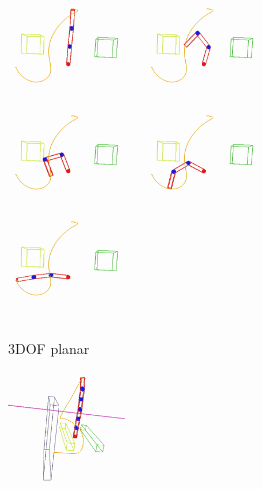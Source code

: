 \documentclass[letterpaper, 10 pt, conference]{ieeeconf}  %
\begin{document}
\begin{figure}[t!]
	\centering
	\begin{subfigure}[b]{\textwidth}
	    \centering
		\includegraphics[height=2.7cm]{fig/planning_efficiency/3dof_1}
		\includegraphics[height=2.7cm]{fig/planning_efficiency/3dof_2}
		\includegraphics[height=2.7cm]{fig/planning_efficiency/3dof_3}
		\includegraphics[height=2.7cm]{fig/planning_efficiency/3dof_4}
		\includegraphics[height=2.7cm]{fig/planning_efficiency/3dof_5}
		\caption{3DOF planar}
		\label{fig:planning_efficiency:3dof:example}
	\end{subfigure}
	\begin{subfigure}[b]{\textwidth}
	    \centering
		\includegraphics[height=3cm]{fig/planning_efficiency/6dof_1}

\end{subfigure}
\end{figure}
\end{document}
